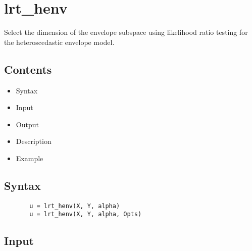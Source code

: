 \documentclass[a4paper,11pt,openany]{memoir}
\begin{document}
\newpage
    
\rmfamily
\color{black}\section{lrt\_henv}

\begin{par}
Select the dimension of the envelope subspace using likelihood ratio testing for the heteroscedastic envelope model.
\end{par} \vspace{1em}

\subsection*{Contents}

\begin{itemize}
\setlength{\itemsep}{-1ex}
   \item Syntax
   \item Input
   \item Output
   \item Description
   \item Example
\end{itemize}


\subsection*{Syntax}


\begin{verbatim}       u = lrt_henv(X, Y, alpha)
       u = lrt_henv(X, Y, alpha, Opts)\end{verbatim}
    

\subsection*{Input}
\end{document}
